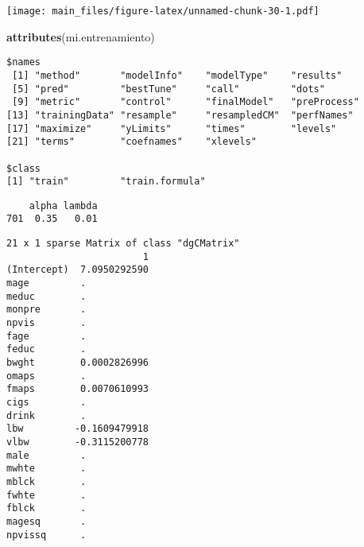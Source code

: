 \documentclass[]{article}
\newenvironment{Shaded}{\begin{snugshade}}{\end{snugshade}}
\newcommand{\KeywordTok}[1]{\textcolor[rgb]{0.13,0.29,0.53}{\textbf{#1}}}
\newcommand{\DataTypeTok}[1]{\textcolor[rgb]{0.13,0.29,0.53}{#1}}
\newcommand{\StringTok}[1]{\textcolor[rgb]{0.31,0.60,0.02}{#1}}
\newcommand{\OperatorTok}[1]{\textcolor[rgb]{0.81,0.36,0.00}{\textbf{#1}}}
\newcommand{\NormalTok}[1]{#1}
\begin{document}
\texttt{[image: main\_files/figure-latex/unnamed-chunk-30-1.pdf]}

\begin{Shaded}
\begin{Highlighting}[]
\KeywordTok{attributes}\NormalTok{(mi.entrenamiento)}
\end{Highlighting}
\end{Shaded}

\begin{verbatim}
$names
 [1] "method"       "modelInfo"    "modelType"    "results"     
 [5] "pred"         "bestTune"     "call"         "dots"        
 [9] "metric"       "control"      "finalModel"   "preProcess"  
[13] "trainingData" "resample"     "resampledCM"  "perfNames"   
[17] "maximize"     "yLimits"      "times"        "levels"      
[21] "terms"        "coefnames"    "xlevels"     

$class
[1] "train"         "train.formula"
\end{verbatim}

\begin{Shaded}
\end{Shaded}

\begin{verbatim}
    alpha lambda
701  0.35   0.01
\end{verbatim}

\begin{Shaded}
\end{Shaded}

\begin{verbatim}
21 x 1 sparse Matrix of class "dgCMatrix"
                        1
(Intercept)  7.0950292590
mage         .           
meduc        .           
monpre       .           
npvis        .           
fage         .           
feduc        .           
bwght        0.0002826996
omaps        .           
fmaps        0.0070610993
cigs         .           
drink        .           
lbw         -0.1609479918
vlbw        -0.3115200778
male         .           
mwhte        .           
mblck        .           
fwhte        .           
fblck        .           
magesq       .           
npvissq      .           
\end{verbatim}
\end{document}
